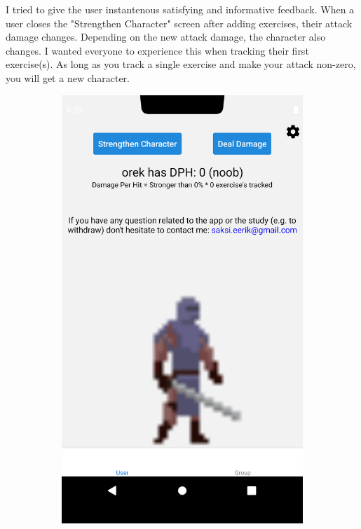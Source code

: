 \documentclass{l4proj}
\begin{document}
I tried to give the user instantenous satisfying and informative feedback. When a user closes the "Strengthen Character" screen after adding exercises, their attack damage changes. Depending on the new attack damage, the character also changes. I wanted everyone to experience this when tracking their first exercise(s). As long as you track a single exercise and make your attack non-zero, you will get a new character. 

\begin{figure}[H]
    \begin{subfigure}{0.45\textwidth}
      \includegraphics[width=\textwidth]{noob_user_page.png}    

\end{subfigure}
\end{figure}
\end{document}
